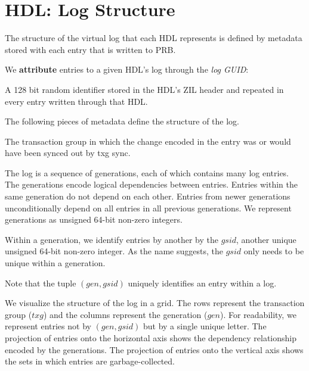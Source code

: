 \documentclass[12pt,a4paper,twoside]{book}
\begin{document}
{\section{HDL: Log Structure}\label{di:prb:logstructure}
The structure of the virtual log that each HDL represents is defined by metadata stored with each entry that is written to PRB.

We \textbf{attribute} entries to a given HDL's log through the \textit{log GUID}:
\begin{description}[noitemsep,leftmargin=1.5cm,labelindent=1cm]
    \item[Log GUID] A 128 bit random identifier stored in the HDL's ZIL header and repeated in every entry written through that HDL.
\end{description}

The following pieces of metadata define the structure of the log.
\begin{description}[noitemsep,leftmargin=1.5cm,labelindent=1cm]
    \item[Transaction Group (txg)] The transaction group in which the change encoded in the entry was or would have been synced out by txg sync.
    \item[Generation Number (gen)] The log is a sequence of generations, each of which contains many log entries.
        The generations encode logical dependencies between entries.
        Entries within the same generation do not depend on each other.
        Entries from newer generations unconditionally depend on all entries in all previous generations.
        We represent generations as unsigned 64-bit non-zero integers.
    \item[Generation-Scoped ID (gsid)] Within a generation, we identify entries by another by the $gsid$, another unique unsigned 64-bit non-zero integer.
        As the name suggests, the $gsid$ only needs to be unique within a generation.
\end{description}
Note that the tuple $(gen, gsid)$ uniquely identifies an entry within a log.

We visualize the structure of the log in a grid.
The rows represent the transaction group ($txg$) and the columns represent the generation ($gen$).
For readability, we represent entries not by $(gen, gsid)$ but by a single unique letter.
The projection of entries onto the horizontal axis shows the dependency relationship encoded by the generations.
The projection of entries onto the vertical axis shows the sets in which entries are garbage-collected.

}
\end{document}
